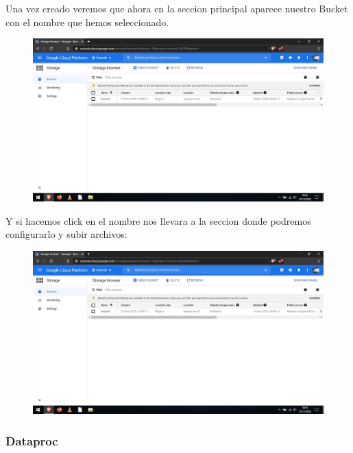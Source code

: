 \documentclass[a4paper,10pt]{article}
\begin{document}
Una vez creado veremos que ahora en la seccion principal aparece nuestro Bucket con el nombre que hemos seleccionado.

\begin{figure}[H]
\begin{center}
\includegraphics[width=500pt]{./fotos/GoogleCloud/16 - GC.jpg}
\end{center}
\end{figure}

Y si hacemos click en el nombre nos llevara a la seccion donde podremos configurarlo y subir archivos:

\begin{figure}[H]
\begin{center}
\includegraphics[width=500pt]{./fotos/GoogleCloud/16 - GC.jpg}
\end{center}
\end{figure}

\subsubsection{Dataproc}
\end{document}
